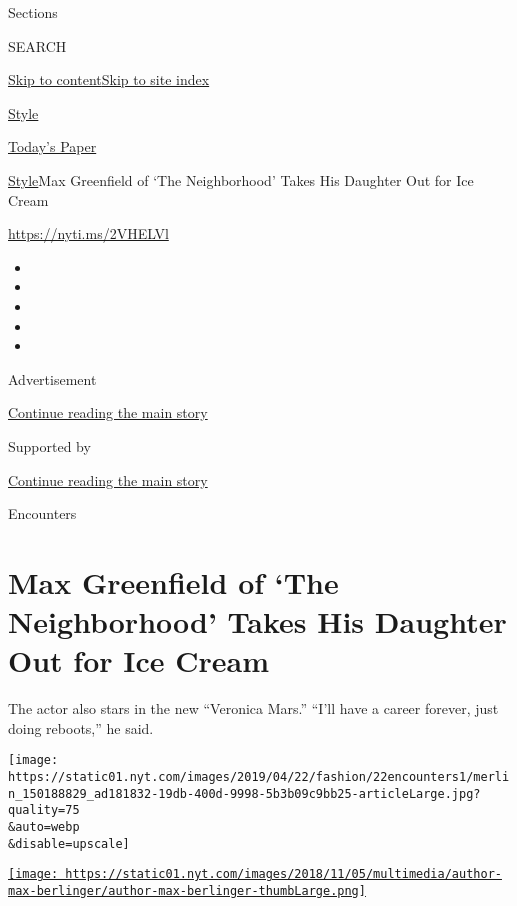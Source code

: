 Sections

SEARCH

\protect\hyperlink{site-content}{Skip to
content}\protect\hyperlink{site-index}{Skip to site index}

\href{https://www.nytimes.com/section/style}{Style}

\href{https://myaccount.nytimes.com/auth/login?response_type=cookie\&client_id=vi}{}

\href{https://www.nytimes.com/section/todayspaper}{Today's Paper}

\href{/section/style}{Style}\textbar{}Max Greenfield of `The
Neighborhood' Takes His Daughter Out for Ice Cream

\href{https://nyti.ms/2VHELVl}{https://nyti.ms/2VHELVl}

\begin{itemize}
\item
\item
\item
\item
\item
\end{itemize}

Advertisement

\protect\hyperlink{after-top}{Continue reading the main story}

Supported by

\protect\hyperlink{after-sponsor}{Continue reading the main story}

Encounters

\hypertarget{max-greenfield-of-the-neighborhood-takes-his-daughter-out-for-ice-cream}{%
\section{Max Greenfield of `The Neighborhood' Takes His Daughter Out for
Ice
Cream}\label{max-greenfield-of-the-neighborhood-takes-his-daughter-out-for-ice-cream}}

The actor also stars in the new ``Veronica Mars.'' ``I'll have a career
forever, just doing reboots,'' he said.

\texttt{[image: https://static01.nyt.com/images/2019/04/22/fashion/22encounters1/merlin\_150188829\_ad181832-19db-400d-9998-5b3b09c9bb25-articleLarge.jpg?quality=75\\\&auto=webp\\\&disable=upscale]}

\href{https://www.nytimes.com/by/max-berlinger}{\texttt{[image: https://static01.nyt.com/images/2018/11/05/multimedia/author-max-berlinger/author-max-berlinger-thumbLarge.png]}}

